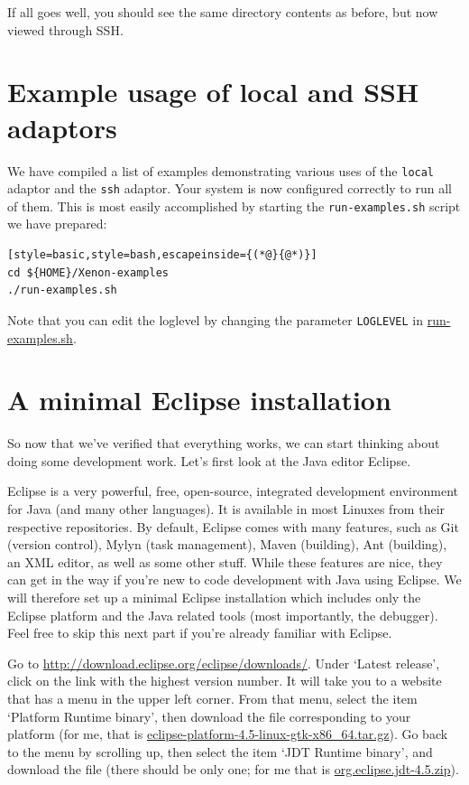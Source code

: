 \documentclass[12pt, a4paper, twoside, openany, titlepage]{book}
\begin{document}
If all goes well, you should see the same directory contents as before, but now viewed through SSH.

\section{Example usage of local and SSH adaptors}

We have compiled a list of examples demonstrating various uses of the \texttt{local} adaptor and the \texttt{ssh} adaptor. Your system is now configured correctly to run all of them. This is most easily accomplished by starting the \texttt{run-examples.sh} script we have prepared:
\begin{lstlisting}[style=basic,style=bash,escapeinside={(*@}{@*)}]
cd ${HOME}/Xenon-examples
./run-examples.sh
\end{lstlisting} %

Note that you can edit the loglevel by changing the parameter \texttt{LOGLEVEL} in \url{run-examples.sh}.





\section{A minimal Eclipse installation}

So now that we've verified that everything works, we can start thinking about doing some development work. Let's first look at the Java editor Eclipse.

Eclipse is a very powerful, free, open-source, integrated development environment for Java (and many other languages). It is available in most Linuxes from their respective repositories. By default, Eclipse comes with many features, such as Git (version control), Mylyn (task management), Maven (building), Ant (building), an XML editor, as well as some other stuff. While these features are nice, they can get in the way if you're new to code development with Java using Eclipse. We will therefore set up a minimal Eclipse installation which includes only the Eclipse platform and the Java related tools (most importantly, the debugger). Feel free to skip this next part if you're already familiar with Eclipse.


Go to \url{http://download.eclipse.org/eclipse/downloads/}. Under `Latest release', click on the link with the highest version number. It will take you to a website that has a menu in the upper left corner. From that menu, select the item `Platform Runtime binary', then download the file corresponding to your platform (for me, that is \url{eclipse-platform-4.5-linux-gtk-x86_64.tar.gz}). Go back to the menu by scrolling up, then select the item `JDT Runtime binary', and download the file (there should be only one; for me that is \url{org.eclipse.jdt-4.5.zip}).
\end{document}
